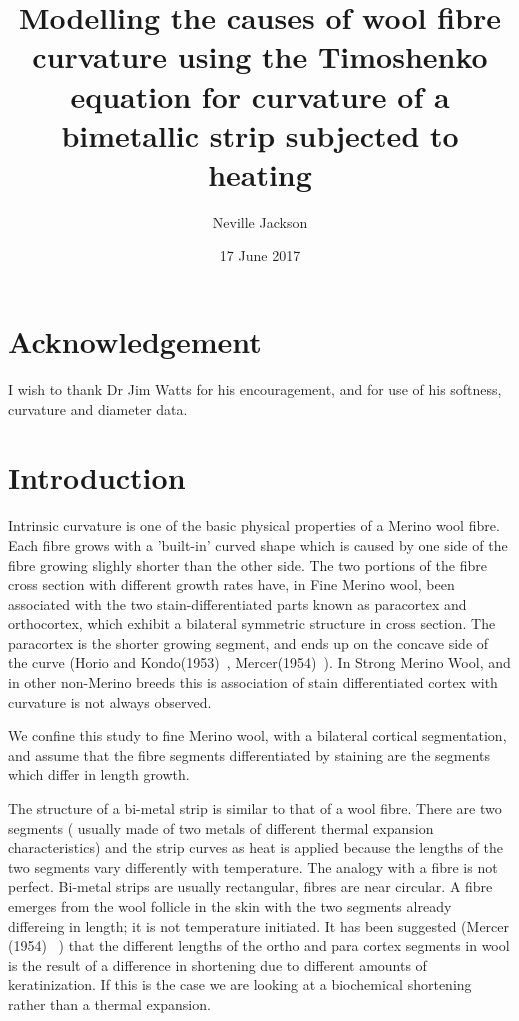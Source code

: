\documentclass[titlepage]{article}  %
\title{ Modelling the causes of wool fibre curvature using the Timoshenko equation for curvature of a bimetallic strip subjected to heating}
\author{Neville Jackson}
\date{17 June 2017}
\begin{document}
 
 
\maketitle      
\tableofcontents

\clearpage
\section{Acknowledgement}
I wish to thank Dr Jim Watts for his encouragement, and for use of his softness, curvature and diameter data.

\section{Introduction} 
Intrinsic curvature is one of the basic physical properties of a Merino wool fibre.  Each fibre grows with a 'built-in' curved shape which is caused by one side of the fibre growing slighly shorter than the other side. The two portions of the fibre cross section with different growth rates have, in Fine Merino wool, been associated with the two stain-differentiated parts known as paracortex and orthocortex, which exhibit a bilateral symmetric structure in cross section. The paracortex is the shorter growing segment, and ends up on the concave side of the curve (Horio and Kondo(1953)~\cite{hori:53}, Mercer(1954)~\cite{merc:54}). In Strong Merino Wool, and in other non-Merino breeds this is association of stain differentiated cortex with curvature is not always observed.

We confine this study to fine Merino wool, with a bilateral cortical segmentation, and assume that the fibre segments differentiated by staining are the segments which differ in length growth.

The structure of a bi-metal strip is similar to that of a wool fibre. There are two segments ( usually made of two metals of different thermal expansion characteristics) and the strip curves as heat is applied because the lengths of the two segments vary differently with temperature. The analogy with a fibre is not perfect. Bi-metal strips are usually rectangular, fibres are near circular. A fibre emerges from the wool follicle in the skin with the two segments already differeing in length; it is not temperature initiated. It has been suggested (Mercer (1954) ~\cite{merc:54}) that the different lengths of the ortho and para cortex segments in wool is the result of a difference in shortening due to different amounts of keratinization. If this is the case we are looking at a biochemical shortening rather than a thermal expansion.
\end{document}
